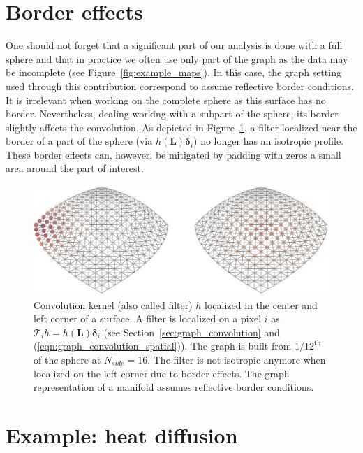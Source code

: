 \documentclass[final,twocolumn,3p,times,sort&compress]{elsarticle}
\newcommand{\figref}[1]{Figure~\ref{fig:#1}}
\newcommand{\secref}[1]{Section~\ref{sec:#1}}
\newcommand{\eqnref}[1]{(\ref{eqn:#1})}
\renewcommand{\b}[1]{{\bm{#1}}}   %
\newcommand{\1}{\b{1}}              %
\newcommand{\0}{\b{0}}              %
\renewcommand{\L}{\b{L}}
\newcommand{\T}{\mathcal{T}}
\begin{document}
\section{Border effects}
\label{sec:border_effects}

One should not forget that a significant part of our analysis is done with a full sphere and that in practice we often use only part of the graph as the data may be incomplete (see \figref{example_maps}).
In this case, the graph setting used through this contribution correspond to assume reflective border conditions.
It is irrelevant when working on the complete sphere as this surface has no border. Nevertheless, dealing working with a subpart of the sphere, its border slightly affects the convolution.
As depicted in \figref{border_effects}, a filter localized near the border of a part of the sphere (via $h(\L) \b \delta_i$) no longer has an isotropic profile.
These border effects can, however, be mitigated by padding with zeros a small area around the part of interest.

\begin{figure}
	\centering
	\includegraphics[width=\linewidth]{border_effects}
	\caption{Convolution kernel (also called filter) $h$ localized in the center and left corner of a surface. A filter is localized on a pixel $i$ as $\T_i h = h(\L) \b \delta_i$ (see \secref{graph_convolution} and \eqnref{graph_convolution_spatial}). The graph is built from $1/12^\text{th}$ of the sphere at $N_{side} = 16$. The filter is not isotropic anymore when localized on the left corner due to border effects. The graph representation of a manifold assumes reflective border conditions.}
	\label{fig:border_effects}
\end{figure}

\section{Example: heat diffusion}
\label{sec:heat_diffusion}
\label{sec:filter_visualization}
\end{document}
